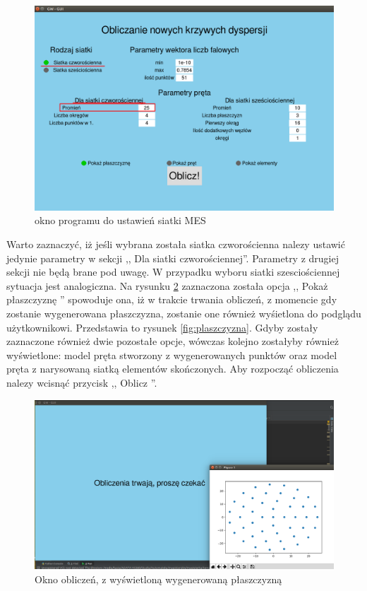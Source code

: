 \begin{figure}[h]
\centering
\includegraphics[width=13cm]{Zdjecia/5/kasia/srednica25}
\caption{okno programu do ustawień siatki MES}
\label{fig:srednica25}
\end{figure}

Warto zaznaczyć, iż jeśli wybrana została siatka czworościenna nalezy ustawić jedynie parametry w sekcji ,, Dla siatki czworościennej''. Parametry z drugiej sekcji nie będą brane pod uwagę. W przypadku wyboru siatki szesciościennej sytuacja jest analogiczna. Na rysunku \ref{fig:srednica25} zaznaczona została opcja ,, Pokaż płaszczyznę '' spowoduje ona, iż w trakcie trwania obliczeń, z momencie gdy zostanie wygenerowana płaszczyzna, zostanie one również wyśietlona do podglądu użytkownikowi. Przedstawia to rysunek \ref{fig:plaszczyzna}. Gdyby zostały zaznaczone również dwie pozostałe opcje, wówczas kolejno zostałyby również wyświetlone: model pręta stworzony z wygenerowanych punktów oraz model pręta z narysowaną siatką elementów skończonych. Aby rozpocząć obliczenia nalezy wcisnąć przycisk ,, Oblicz ''.

\begin{figure}[h]
\centering
\includegraphics[width=13cm]{Zdjecia/5/kasia/plaszczyzna}
\caption{Okno obliczeń, z wyświetloną wygenerowaną płaszczyzną}
\label{fig:srednica25}
\end{figure}

